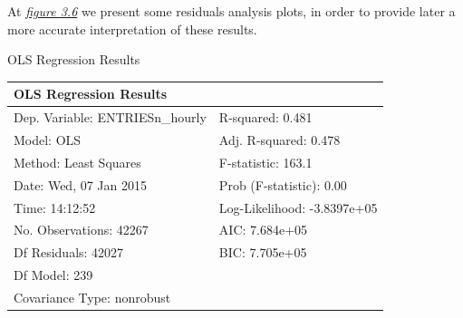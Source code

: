 \documentclass[letterpaper,10pt,english]{sphinxmanual}
\begin{document}
At {\hyperref[section2:figure36]{\emph{figure 3.6}}} we present some residuals analysis plots, in order
to provide later a more accurate interpretation of these results.
\label{section2:table31}

\begin{threeparttable}
\capstart\caption{OLS Regression Results}

\begin{tabulary}{\linewidth}{|L|L|}
\hline
\textsf{\relax 
OLS Regression Results
} & \textsf{\relax }\\
\hline
Dep. Variable:        ENTRIESn\_hourly
 & 
R-squared:                       0.481
\\

Model:                            OLS
 & 
Adj. R-squared:                  0.478
\\

Method:                 Least Squares
 & 
F-statistic:                     163.1
\\

Date:                Wed, 07 Jan 2015
 & 
Prob (F-statistic):               0.00
\\

Time:                        14:12:52
 & 
Log-Likelihood:            -3.8397e+05
\\

No. Observations:               42267
 & 
AIC:                         7.684e+05
\\

Df Residuals:                   42027
 & 
BIC:                         7.705e+05
\\

Df Model:                         239
 & \\

Covariance Type:            nonrobust
 & \\
\hline\end{tabulary}

\end{threeparttable}

\label{section2:table32}
\end{document}
